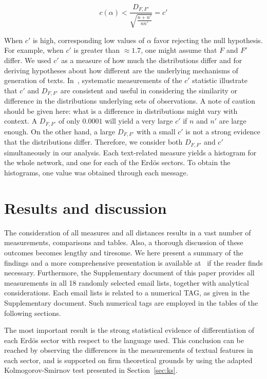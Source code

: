 \documentclass[review]{elsarticle}
\begin{document}
\begin{equation}\label{eq:ks2}
c(\alpha) < \frac{D_{F,F'}}{\sqrt{\frac{n+n'}{nn'}}} = c'
\end{equation}

When $c'$ is high, corresponding low values of $\alpha$ favor rejecting the null hypothesis.
For example, when $c'$ is greater than $\approx 1.7$, one might assume that $F$ and $F'$ differ.
We used $c'$ as a measure of how much
the distributions differ
and for deriving hypotheses
about how different are the underlying mechanisms of generation of texts.
In~\cite{kolm},
systematic measurements of the $c'$ statistic
illustrate that $c'$ and $D_{F,F'}$ are consistent and useful in considering the
similarity or difference in the distributions underlying sets of observations.
A note of caution should be given here: what is a difference in distributions
might vary with context.
A $D_{F,F'}$ of only $0.0001$ will yield a very large $c'$ if $n$ and $n'$ are large enough.
On the other hand, a large $D_{F,F'}$ with a small $c'$ is not a strong evidence that
the distributions differ.
Therefore, we consider both $D_{F,F'}$ and $c'$ simultaneously in our analysis.
Each text-related measure yields a histogram for the whole network, and one for each
of the Erdös sectors.
To obtain the histograms, one value was obtained through each message.

\section{Results and discussion}\label{sres}\label{sec:tresults}
The consideration of all measures and all distances results in a vast number of measurements, comparisons and tables.
Also, a thorough discussion of these outcomes becomes lengthy and tiresome.
We here present a summary of the findings and
a more comprehensive presentation is available at~\cite{thesis} if
the reader finds necessary.
Furthermore, the Supplementary document of this paper provides all measurements in all 18 randomly selected email lists, together with analytical considerations.
Each email lists is related to a numerical
TAG,
as given in the Supplementary document.
Such numerical tags are employed in the tables of the following sections.

The most important result is the strong statistical evidence of differentiation of each Erd\"os sector with respect to the language used.
This conclusion can be reached by observing the differences in the measurements of textual features in
each sector, and is supported on firm theoretical grounds by using the adapted Kolmogorov-Smirnov test presented in Section~\ref{sec:ks}.
\end{document}
